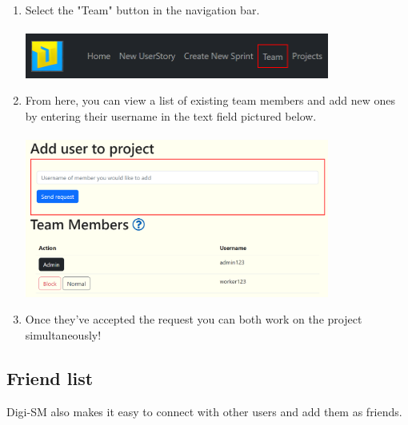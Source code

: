 \documentclass{article}
\begin{document}
\begin{enumerate}
    \item Select the "Team" button in the navigation bar.\\\\
    \includegraphics[width=10cm]{teamNav.png}
    \item From here, you can view a list of existing team members and add new ones by entering their username in the text field pictured below. \\\\
    \includegraphics[width=10cm]{team.png}
    \item Once they’ve accepted the request you can both work on the project simultaneously!
\end{enumerate}

\newpage

\subsection{Friend list}

Digi-SM also makes it easy to connect with other users and add them as friends. 
\end{document}
